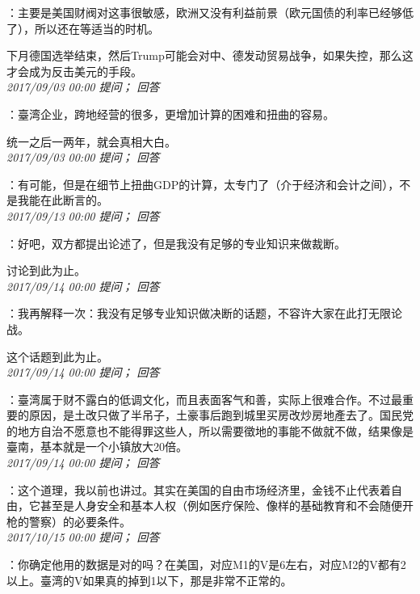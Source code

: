 \documentclass[twocolumn]{ctexart}
\begin{document}
：主要是美国财阀对这事很敏感，欧洲又没有利益前景（欧元国债的利率已经够低了），所以还在等适当的时机。

下月德国选举结束，然后Trump可能会对中、德发动贸易战争，如果失控，那么这才会成为反击美元的手段。\\

\textit{\hfill\noindent\small 2017/09/03 00:00 提问； 回答}

：臺湾企业，跨地经营的很多，更增加计算的困难和扭曲的容易。

统一之后一两年，就会真相大白。\\

\textit{\hfill\noindent\small 2017/09/03 00:00 提问； 回答}

：有可能，但是在细节上扭曲GDP的计算，太专门了（介于经济和会计之间），不是我能在此断言的。\\

\textit{\hfill\noindent\small 2017/09/13 00:00 提问； 回答}

：好吧，双方都提出论述了，但是我没有足够的专业知识来做裁断。

讨论到此为止。\\

\textit{\hfill\noindent\small 2017/09/14 00:00 提问； 回答}

：我再解释一次：我没有足够专业知识做决断的话题，不容许大家在此打无限论战。

这个话题到此为止。\\

\textit{\hfill\noindent\small 2017/09/14 00:00 提问； 回答}

：臺湾属于财不露白的低调文化，而且表面客气和善，实际上很难合作。不过最重要的原因，是土改只做了半吊子，土豪事后跑到城里买房改炒房地產去了。国民党的地方自治不愿意也不能得罪这些人，所以需要徵地的事能不做就不做，结果像是臺南，基本就是一个小镇放大20倍。\\

\textit{\hfill\noindent\small 2017/09/14 00:00 提问； 回答}

：这个道理，我以前也讲过。其实在美国的自由市场经济里，金钱不止代表着自由，它甚至是人身安全和基本人权（例如医疗保险、像样的基础教育和不会随便开枪的警察）的必要条件。\\

\textit{\hfill\noindent\small 2017/10/15 00:00 提问； 回答}

：你确定他用的数据是对的吗？在美国，对应M1的V是6左右，对应M2的V都有2以上。臺湾的V如果真的掉到1以下，那是非常不正常的。
\end{document}
